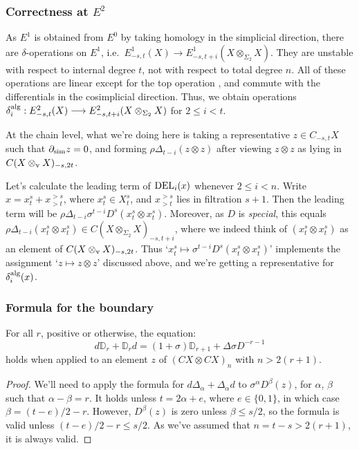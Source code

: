 \documentclass[10pt]{article}
\newcommand{\twist}{\sigma}
\begin{document}
\begin{AdamsSSEQ operations final}
\subsubsection*{Correctness at $E^2$}
As $E^1$ is obtained from $E^0$ by taking homology in the simplicial direction, there are $\delta$-operations on $E^1$, i.e.\ $E^1_{-s,t}(X)\to E^1_{-s,t+i}(X\otimes_{\Sigma_2}X)$. They are unstable with respect to internal degree $t$, not with respect to total degree $n$. All of these operations are linear except for the top operation \cite[4.2]{DwyerHtpyOpsSimpComAlg.pdf}, and commute with the differentials in the cosimplicial direction. Thus, we obtain operations $\delta_i^\textup{alg}:E^2_{-s,t}(X)\to E^2_{-s,t+i}(X\otimes_{\Sigma_2}X)$ for $2\leq i<t$.

At the chain level, what we're doing here is taking a representative $z\in C_{-s,t}X$ such that $\partial_\textup{sim}z=0$, and forming $\rho\Delta_{t-i}(z\otimes z)$ after viewing $z\otimes z$ as lying in $C(X\otimes_\textup{v}X)_{-s,2t}$.

Let's calculate the leading term of $\textup{DEL}_{i}(x)$ whenever $2\leq i<n$. Write $x=x^s_t+x^{>s}_{>t}$, where $x^s_t\in X^s_t$, and $x^{>s}_{>t}$ lies in filtration $s+1$. Then the leading term will be $\rho\Delta_{t-i}\twist^{t-i}D^s (x^s_t\otimes x^s_t)$. Moreover, as $D$ is \emph{special}, this equals $\rho{\Delta}_{t-i}(x^s_t\otimes x^s_t)\in C(X\otimes_{\Sigma_2} X)_{-s,t+i}$, where we indeed think of $(x^s_t\otimes x^s_t)$ as an element of $C(X\otimes_\textup{v}X)_{-s,2t}$. Thus `$x^s_t\mapsto \twist^{t-i}D^s(x^s_t\otimes x^s_t)$' implements the assignment `$z\mapsto z\otimes z$' discussed above, and we're getting a representative for $\delta_i^\textup{alg}(x)$.

\newcommand{\twolinesum}[2]{\mathop{\sum_{\mathclap{#1}}}_{\mathclap{#2}}}
\newcommand{\onelinesum}[1]{\sum_{\mathclap{#1}}}
\subsubsection*{Formula for the boundary}
\begin{lem}\label{boundaryVsBBD}
For all $r$, positive or otherwise, the equation:
\[d\mathbb{D}_r+\mathbb{D}_rd=(1+\twist)\mathbb{D}_{r+1}+\Delta\sigma D^{-r-1}\]
holds when applied to an element $z$ of $(CX\otimes CX)_{n}$ with $n> 2(r+1)$.
\end{lem}
\begin{proof}We'll need to apply the formula for $d\Delta_\alpha+\Delta_\alpha d$ to $\twist^\alpha D^\beta(z)$, for $\alpha$, $\beta$ such that $\alpha-\beta=r$. %
It holds unless $t=2\alpha+e$, where $e\in\{0,1\}$, in which case $\beta=(t-e)/2-r$. However, $D^\beta(z)$ is zero unless $\beta\leq s/2$, so the formula is valid unless $(t-e)/2-r\leq s/2$. As we've assumed that $n=t-s>2(r+1)$, it is always valid.


\end{proof}
\end{AdamsSSEQ operations final}
\end{document}
